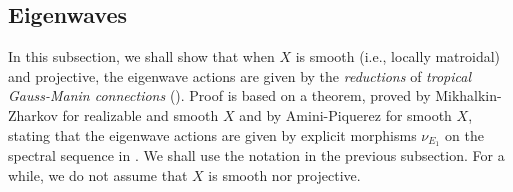 \documentclass[12pt,a4]{amsart}
\numberwithin{equation}{section}
\numberwithin{figure}{section}
\begin{document}
 \subsection{Eigenwaves}\label{sub:eigenwaves}
  In this subsection, we shall show that when $X$ is smooth (i.e., locally matroidal) and projective, 
  the eigenwave actions 
   are given by the \emph{reductions} of \emph{tropical Gauss-Manin connections} (). 
  Proof is based on a theorem,  
  proved by 
   Mikhalkin-Zharkov \cite[Proof of Theorem 3]{MikhalkinZharkovTropicaleignewaveandintermediatejacobians2014} for realizable and smooth $X$
  and by Amini-Piquerez \cite[Corollary 6.21]{AminiPiquerezHodgetheoryfortropicalvarieties2020} for smooth $X$, 
  stating  
  that the eigenwave actions 
  are given by explicit morphisms $ \nu_{E_1}  $ on the spectral sequence in .
  We shall use the notation in the previous subsection. 
  For a while, we do not assume that $X$ is smooth nor projective.
\end{document}
